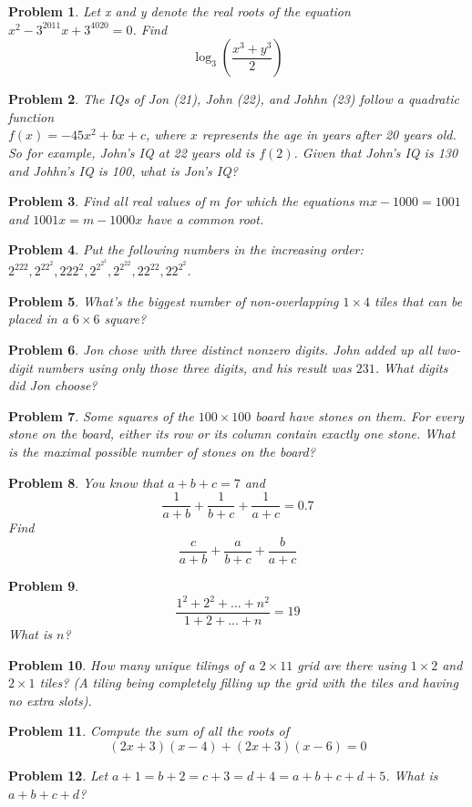 \documentclass[a4paper,12pt]{article}
\theoremstyle{perfect}
\newtheorem{prb}{Problem}
\begin{document}
\begin{prb}
Let x and y denote the real roots of the equation $x^2 - 3^{2011}x + 3^{4020} = 0$. Find $$\log_3\left(\frac{x^3 + y^3}{2}\right)$$
\end{prb}

\begin{prb}
The IQs of Jon (21), John (22), and Johhn (23) follow a quadratic function\\ $f(x) = -45x^2 + bx + c$, where $x$ represents the age in years after 20 years old. So for example, John's IQ at 22 years old is $f(2)$. Given that John's IQ is 130 and Johhn's IQ is 100, what is Jon's IQ?
\end{prb}


\begin{prb}
Find all real values of $m$ for which the equations $mx-1000=1001$ and $1001x = m - 1000x$ have a common root.
\end{prb}

\begin{prb}
Put the following numbers in the increasing order: $2^{222}, 2^{22^2}, 222^2, 2^{2^{2^2}}, 2^{2^{22}}, 22^{22}, 22^{2^2}$. 
\end{prb}


\begin{prb}
What's the biggest number of non-overlapping $1\times 4$ tiles that can be placed in a $6\times 6$ square?
\end{prb}

\begin{prb}
Jon chose with three distinct nonzero digits. John added up all two-digit numbers using only those three digits, and his result was $231$. What digits did Jon choose?
\end{prb}

\begin{prb}
Some squares of the $100\times 100$ board have stones on them. For every stone on the board, either its row or its column contain exactly one stone. What is the maximal possible number of stones on the board?
\end{prb}

\begin{prb}
You know that $a+b+c=7$ and $$\frac{1}{a+b} + \frac{1}{b+c} + \frac{1}{a+c} = 0.7$$ Find $$\frac{c}{a+b} + \frac{a}{b+c} + \frac{b}{a+c}$$
\end{prb}

\begin{prb}
$$\frac{1^2 + 2^2 + ... + n^2}{1 + 2 + ... + n} = 19$$
What is $n$?
\end{prb}

\begin{prb}
How many unique tilings of a $2 \times 11$ grid are there using $1 \times 2$ and $2 \times 1$ tiles? (A tiling being completely filling up the grid with the tiles and having no extra slots).
\end{prb}

\begin{prb}
Compute the sum of all the roots of 
$$(2x+3)(x-4)+(2x+3)(x-6)=0$$
\end{prb}

\begin{prb}
Let $a + 1 = b + 2 = c + 3 = d + 4 = a + b + c + d + 5$. What is $a + b + c + d$?
\end{prb}
\end{document}
